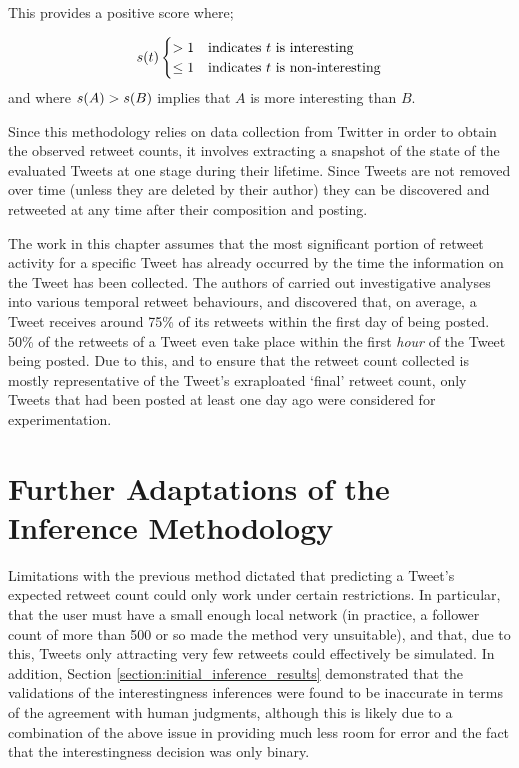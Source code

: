 This provides a positive score where;

\[
s(t)
\begin{cases}
    > 1		&	\text{indicates } t	\text{ is interesting} \\
    \leq 1	&	\text{indicates } t	\text{ is non-interesting}
\end{cases}
\]
and where $s(A) > s(B)$ implies that $A$ is more interesting than $B$.

Since this methodology relies on data collection from Twitter in order to obtain the observed retweet counts, it involves extracting a snapshot of the state of the evaluated Tweets at one stage during their lifetime. Since Tweets are not removed over time (unless they are deleted by their author) they can be discovered and retweeted at any time after their composition and posting.

The work in this chapter assumes that the most significant portion of retweet activity for a specific Tweet has already occurred by the time the information on the Tweet has been collected. The authors of \cite{kwak10} carried out investigative analyses into various temporal retweet behaviours, and discovered that, on average, a Tweet receives around 75\% of its retweets within the first day of being posted. 50\% of the retweets of a Tweet even take place within the first \textit{hour} of the Tweet being posted. Due to this, and to ensure that the retweet count collected is mostly representative of the Tweet's exraploated `final' retweet count, only Tweets that had been posted at least one day ago were considered for experimentation.


\section{Further Adaptations of the Inference Methodology}
Limitations with the previous method dictated that predicting a Tweet's expected retweet count could only work under certain restrictions. In particular, that the user must have a small enough local network (in practice, a follower count of more than 500 or so made the method very unsuitable), and that, due to this, Tweets only attracting very few retweets could effectively be simulated. In addition, Section \ref{section:initial_inference_results} demonstrated that the validations of the interestingness inferences were found to be inaccurate in terms of the agreement with human judgments, although this is likely due to a combination of the above issue in providing much less room for error and the fact that the interestingness decision was only binary.

